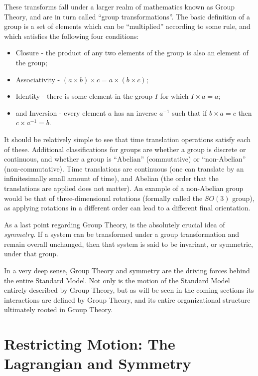     These transforms fall under a larger realm of mathematics known as Group Theory,
        and are in turn called ``group transformations''.
    The basic definition of a group is a set of elements which can be ``multiplied'' according to some rule,
        and which satisfies the following four conditions\cite{Cheng_book}:
    \begin{itemize}
        \item Closure - the product of any two elements of the group is also an element of the group;
        \item Associativity - $(a \times b)\times c = a\times(b \times c)$;
        \item Identity - there is some element in the group $I$ for which $I \times a=a$;
        \item and Inversion - every element $a$ has an inverse $a^{-1}$ such that if $b \times a = c$ then $c \times a^{-1} = b$.
    \end{itemize}

    It should be relatively simple to see that time translation operations satisfy each of these.
    Additional classifications for groups are whether a group is discrete or continuous,
        and whether a group is ``Abelian'' (commutative) or ``non-Abelian'' (non-commutative).
    Time translations are continuous (one can translate by an infinitesimally small amount of time),
        and Abelian (the order that the translations are applied does not matter).
    An example of a non-Abelian group would be that of three-dimensional rotations (formally called the $SO(3)$ group),
        as applying rotations in a different order can lead to a different final orientation.

    As a last point regarding Group Theory, is the absolutely crucial idea of \textit{symmetry}.
    If a system can be transformed under a group transformation and remain overall unchanged,
        then that system is said to be invariant, or symmetric, under that group.

    In a very deep sense, Group Theory and symmetry are the driving forces behind the entire Standard Model.
    Not only is the motion of the Standard Model entirely described by Group Theory,
        but as will be seen in the coming sections its interactions are defined by Group Theory,
        and its entire organizational structure ultimately rooted in Group Theory.


\section{Restricting Motion: The Lagrangian and Symmetry}
    
